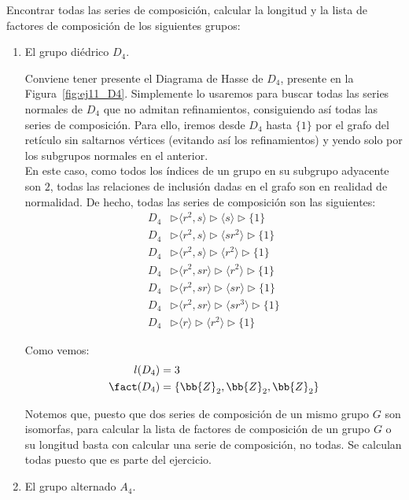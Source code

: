\begin{ejercicio}
    Encontrar todas las series de composición, calcular la longitud y la lista de factores de composición de los siguientes grupos:
    \begin{enumerate}
        \item El grupo diédrico $D_4$.
        
        Conviene tener presente el Diagrama de Hasse de $D_4$, presente en la Figura~\ref{fig:ej11_D4}. Simplemente lo usaremos para buscar todas las series normales de $D_4$ que no admitan refinamientos, consiguiendo así todas las series de composición. Para ello, iremos desde $D_4$ hasta $\{1\}$ por el grafo del retículo sin saltarnos vértices (evitando así los refinamientos) y yendo solo por los subgrupos normales en el anterior.\\

        En este caso, como todos los índices de un grupo en su subgrupo adyacente son $2$, todas las relaciones de inclusión dadas en el grafo son en realidad de normalidad. De hecho, todas las series de composición son las siguientes:
        \begin{align*}
            D_4 &\rhd \langle r^2, s \rangle \rhd  \langle s \rangle  \rhd \{1\} \\
            D_4 &\rhd \langle r^2, s \rangle \rhd \langle sr^2 \rangle  \rhd \{1\} \\
            D_4 &\rhd \langle r^2, s \rangle \rhd \langle r^2 \rangle  \rhd \{1\} \\
            D_4 &\rhd \langle r^2, sr \rangle  \rhd \langle r^2 \rangle  \rhd \{1\} \\
            D_4 &\rhd \langle r^2, sr \rangle  \rhd \langle sr \rangle  \rhd \{1\} \\
            D_4 &\rhd \langle r^2, sr \rangle  \rhd \langle sr^3 \rangle  \rhd \{1\} \\
            D_4 &\rhd \langle r \rangle \rhd \langle r^2 \rangle  \rhd \{1\}
        \end{align*}

        Como vemos:
        \begin{align*}
            l(D_4) &= 3 \\
            \fact(D_4) &= \{\bb{Z}_2, \bb{Z}_2, \bb{Z}_2\}
        \end{align*}
        \begin{observacion}
            Notemos que, puesto que dos series de composición de un mismo grupo $G$ son isomorfas, para calcular la lista de factores de composición de un grupo $G$ o su longitud basta con calcular una serie de composición, no todas. Se calculan todas puesto que es parte del ejercicio.
        \end{observacion}
        \item El grupo alternado $A_4$.
        

\end{enumerate}
\end{ejercicio}
